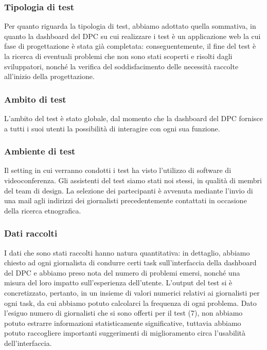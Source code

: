 \subsubsection{Tipologia di test}
Per quanto riguarda la tipologia di test, abbiamo adottato quella sommativa, in quanto la dashboard del DPC su cui realizzare i test è un applicazione web la cui fase di progettazione è stata già completata: conseguentemente, il fine del test è la ricerca di eventuali problemi che non sono stati scoperti e risolti dagli sviluppatori, nonché la verifica del soddisfacimento delle necessità raccolte all'inizio della progettazione.

\subsubsection{Ambito di test}
L'ambito del test è stato globale, dal momento che la dashboard del DPC fornisce a tutti i suoi utenti la possibilità di interagire con ogni sua funzione.

\subsubsection{Ambiente di test}
Il setting in cui verranno condotti i test ha visto l'utilizzo di software di videoconferenza. Gli assistenti del test siamo stati noi stessi, in qualità di membri del team di design. La selezione dei partecipanti è avvenuta mediante l'invio di una mail agli indirizzi dei giornalisti precedentemente contattati in occasione della ricerca etnografica.

\subsubsection{Dati raccolti}
I dati che sono stati raccolti hanno natura quantitativa: in dettaglio, abbiamo chiesto ad ogni giornalista di condurre certi task sull'interfaccia della dashboard del DPC e abbiamo preso nota del numero di problemi emersi, nonché una misura del loro impatto sull'esperienza dell'utente. L'output del test si è concretizzato, pertanto, in un insieme di valori numerici relativi ai giornalisti per ogni task, da cui abbiamo potuto calcolarci la frequenza di ogni problema.
Dato l'esiguo numero di giornalisti che si sono offerti per il test (7), non abbiamo potuto estrarre informazioni statisticamente significative, tuttavia abbiamo potuto raccogliere importanti suggerimenti di miglioramento circa l'usabilità dell'interfaccia.

